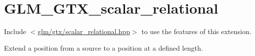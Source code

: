 \hypertarget{group__gtx__scalar__relational}{}\section{G\+L\+M\+\_\+\+G\+T\+X\+\_\+scalar\+\_\+relational}
\label{group__gtx__scalar__relational}
Include $<$\hyperlink{scalar__relational_8hpp}{glm/gtx/scalar\+\_\+relational.\+hpp}$>$ to use the features of this extension.

Extend a position from a source to a position at a defined length. 